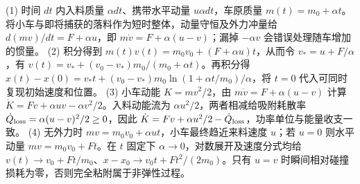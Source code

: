 (1) 时间 \(dt\) 内入料质量 \(\alpha dt\)、携带水平动量 \(u\alpha dt\)，车原质量 \(m(t)=m_0+\alpha t\)。将小车与即将捕获的落料作为短时整体，动量守恒及外力冲量给 \(d(mv)/dt=F+\alpha u\)，即 \(m\dot v=F+\alpha(u-v)\)；漏掉 \(-\alpha v\) 会错误处理随车增加的惯量。
(2) 积分得到 \(m(t)v(t)=m_0v_0+(F+\alpha u)t\)，从而令 \(v_* =u+F/\alpha\)，有 \(v(t)=v_*+(v_0-v_*)m_0/(m_0+\alpha t)\)。再积分得 \(x(t)-x(0)=v_*t+(v_0-v_*)m_0\ln(1+\alpha t/m_0)/\alpha\)，将 \(t=0\) 代入可同时复现初始速度和位置。
(3) 小车动能 \(K=mv^2/2\)，由 \(m\dot v=F+\alpha(u-v)\) 计算 \(\dot K=Fv+\alpha uv-\alpha v^2/2\)。入料动能流为 \(\alpha u^2/2\)，两者相减给吸附耗散率 \(\dot Q_{\rm loss}=\alpha(u-v)^2/2\ge0\)，因此 \(\dot K=Fv+\alpha u^2/2-\dot Q_{\rm loss}\)，功率单位与能量收支一致。
(4) 无外力时 \(mv=m_0v_0+\alpha ut\)，小车最终趋近来料速度 \(u\)；若 \(u=0\) 则水平动量 \(mv=m_0v_0+Ft\)。在 \(t\) 固定下 \(\alpha\to0\)，对数展开及速度分式均给 \(v(t)\to v_0+Ft/m_0\)、\(x-x_0\to v_0t+Ft^2/(2m_0)\)。只有 \(u=v\) 时瞬间相对碰撞损耗为零，否则完全粘附属于非弹性过程。
